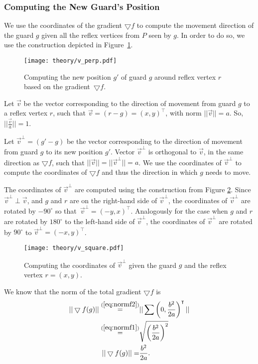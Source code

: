 \newpage
\subsubsection{Computing the New Guard's Position}
We use the coordinates of the gradient $\bigtriangledown f$ to compute the movement direction of the guard $g$ given all the reflex vertices from $P$ seen by $g$. In order to do so, we  use the construction depicted in Figure~\ref{fig:vperp}. 

\begin{figure}[h!]
    \centering
    \texttt{[image: theory/v\_perp.pdf]}
    \caption{Computing the new position $g'$ of guard $g$ around reflex vertex $r$ based on the gradient~$\bigtriangledown f$.}
    \label{fig:vperp}
\end{figure}

Let $\vec v$ be the vector corresponding to the direction of movement from guard $g$ to a reflex vertex $r$, such that $\vec{v} = (r - g) = (x, y)^\intercal$, with norm $||\vec{v}|| = a$. So, $||\frac{\vec v}{a}|| = 1$.

Let $\vec{v}^\perp  = (g' - g)$ be the vector corresponding to the direction of movement from guard $g$ to its new position $g'$. Vector $\vec v^\perp$ is orthogonal to $\vec{v}$, in the same direction as $\bigtriangledown f$, such that $||\vec{v}|| = ||\vec{v}^\perp|| = a$. We  use the coordinates of $\vec{v}^\perp$ to compute the coordinates of $\bigtriangledown f$ and thus the direction in which $g$ needs to move.

The coordinates of $\vec v^\perp$ are computed using the construction from Figure \ref{fig:vsquare}. Since $\vec v^\perp \perp \vec v$, and $g$ and $r$ are on the right-hand side of $\vec v^\perp$, the coordinates of $\vec v^\perp$ are rotated by $-90^\circ$ so that~$\vec v^\perp = (-y, x)^\intercal$. Analogously for the case when $g$ and $r$ are rotated by $180^\circ$ to the left-hand side of $\vec v^\perp$, the coordinates of $\vec v^\perp$ are rotated by $90^\circ$ to $\vec v^\perp = (-x, y)^\intercal$.

\begin{figure}[h!]
    \centering
    \texttt{[image: theory/v\_square.pdf]}
    \caption{Computing the coordinates of $\vec v^\perp$ given the guard $g$ and the reflex vertex $r = (x, y)$.}
    \label{fig:vsquare}
\end{figure}

We know that the norm of the total gradient $\bigtriangledown f$ is 
\begin{align}
    ||\bigtriangledown f(g)|| \overset{(\ref{eq:normf2})}{=} &||\sum \left(0, \frac{b^2}{2a}\right)^\intercal|| \nonumber \\
    \overset{(\ref{eq:normf1})}{=} &\sqrt{\left(\frac{b^2}{2a}\right)^2} \nonumber \\
    ||\bigtriangledown f(g)|| = &\frac{b^2}{2a}. \label{eq:normf}
\end{align}

